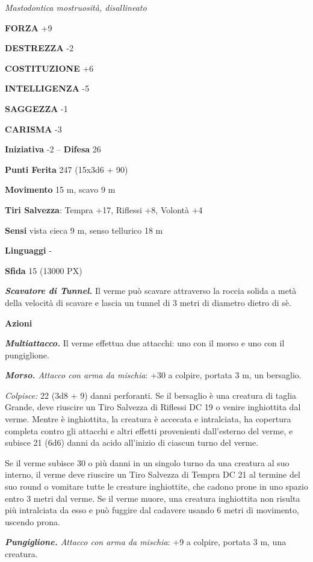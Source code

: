 \begin{multicols}{2}
	\textit{Mastodontica mostruosità, disallineato}

	\textbf{FORZA} +9

	\textbf{DESTREZZA} -2

	\textbf{COSTITUZIONE} +6

	\textbf{INTELLIGENZA} -5

	\textbf{SAGGEZZA} -1

	\textbf{CARISMA} -3

	\textbf{Iniziativa} -2 -- \textbf{Difesa} 26

	\textbf{Punti Ferita} 247 (15x3d6 + 90)

	\textbf{Movimento} 15 m, scavo 9 m

	\textbf{Tiri Salvezza}: Tempra +17, Riflessi +8, Volontà +4

	\textbf{Sensi} vista cieca 9 m, senso tellurico 18 m

	\textbf{Linguaggi} -

	\textbf{Sfida} 15 (13000 PX)

	\textit{\textbf{Scavatore di Tunnel.}} Il verme può scavare attraverso la roccia solida a metà della velocità di scavare e lascia un tunnel di 3 metri di diametro dietro di sè.

	\textbf{Azioni}

	\textit{\textbf{Multiattacco.}} Il verme effettua due attacchi: uno con il morso e uno con il pungiglione.

	\textit{\textbf{Morso.} Attacco con arma da mischia}: +30 a colpire, portata 3 m, un bersaglio.

	\textit{Colpisce:} 22 (3d8 + 9) danni perforanti. Se il bersaglio è una creatura di taglia Grande, deve riuscire un Tiro Salvezza di Riflessi DC 19 o venire inghiottita dal verme. Mentre è inghiottita, la creatura è accecata e intralciata, ha copertura completa contro gli attacchi e altri effetti provenienti dall'esterno del verme, e subisce 21 (6d6) danni da acido all'inizio di ciascun turno del verme.

	Se il verme subisce 30 o più danni in un singolo turno da una creatura al suo interno, il verme deve riuscire un Tiro Salvezza di Tempra DC 21 al termine del suo round o vomitare tutte le creature inghiottite, che cadono prone in uno spazio entro 3 metri dal verme. Se il verme muore, una creatura inghiottita non risulta più intralciata da esso e può fuggire dal cadavere usando 6 metri di movimento, uscendo prona.

	\textit{\textbf{Pungiglione.} Attacco con arma da mischia}: +9 a colpire, portata 3 m, una creatura.


\end{multicols}
